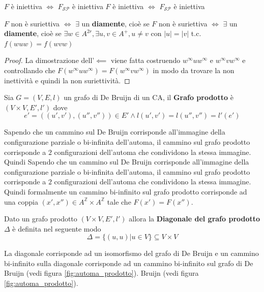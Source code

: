 \begin{teorema}
    $F$ è iniettiva $\iff$ $F_{\mathcal{SP}}$ è iniettiva
    $F$ è iniettiva $\iff$ $F_{\mathcal{SP}}$ è iniettiva
\end{teorema}

\begin{teorema}
    $F$ non è suriettiva $\iff$ $\exists$ un \textbf{diamente}, cioè se
    $F$ non è suriettiva $\iff$ $\exists$ un \textbf{diamente}, cioè se
    $\exists w \in A^{2r}, \exists u,v \in A^+, u\ne v$ con $|u|=|v|$ t.c. $f(wuw)=f(wvw)$
    \begin{proof}
        La dimostrazione dell'$\impliedby$ viene fatta costruendo $w^\infty u w^\infty$
        e $w^\infty v w^\infty$ e controllando che $F(w^\infty u w^\infty) = F(w^\infty v w^\infty)$
        in modo da trovare la non inettività e quindi la non suriettività.
    \end{proof}
\end{teorema}

\begin{definizione}
    Sia $G=(V,E,l)$ un grafo di De Bruijn di un CA, il \textbf{Grafo prodotto}
    è $(V\times V,E',l')$ dove $$e'=((u',v'), (u'',v''))\in E'\land l(u',v') = l(u'',v'') = l'(e')$$
\end{definizione}

Sapendo che un cammino sul De Bruijn corrisponde all'immagine della configurazione
parziale o bi-infinita dell'automa, il cammino sul grafo prodotto corrisponde
a $2$ configurazioni dell'automa che condividono la stessa immagine. Quindi
Sapendo che un cammino sul De Bruijn corrisponde all'immagine della configurazione
parziale o bi-infinita dell'automa, il cammino sul grafo prodotto corrisponde
a $2$ configurazioni dell'automa che condividono la stessa immagine. Quindi
formalmente un cammino bi-infinito sul grafo prodotto corrisponde ad una coppia
$(x',x'')\in A^\mathbb{Z} \times A^\mathbb{Z} $ tale che $F(x')=F(x'')$.

\begin{definizione}
    Dato un grafo prodotto $(V\times V,E',l')$ allora la \textbf{Diagonale del grafo prodotto}
    $\Delta$ è definita nel seguente modo
    $$\Delta = \{(u,u)| u \in V\}\subseteq V\times V$$
\end{definizione}
La diagonale corrisponde ad un isomorfismo del grafo di De Bruijn e un cammino
bi-infinito sulla diagonale corrisponde ad un cammino bi-infinito sul grafo di De
Bruijn (vedi figura \ref{fig:automa_prodotto}).
Bruijn (vedi figura \ref{fig:automa_prodotto}).

